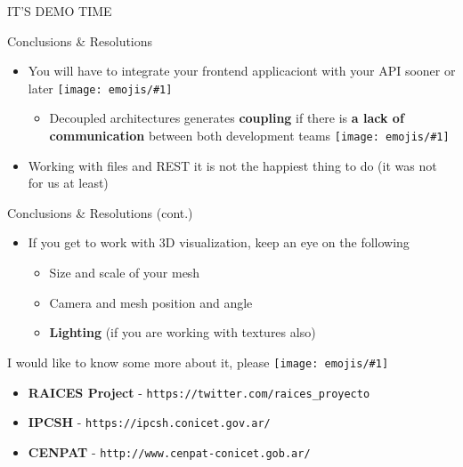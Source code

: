 \documentclass{beamer}
\newcommand{\emoji}[1]{\texttt{[image: emojis/\#1]}}
\begin{document}
\begin{frame}[fragile]
    \begin{center}
        \Huge
        IT'S DEMO TIME
    \end{center}
\end{frame}

\begin{frame}[fragile]{Conclusions \& Resolutions}
    \begin{itemize}
        \item You will have to integrate your frontend applicaciont  with your API sooner or later \emoji{man_shrugging.png}
        \begin{itemize}
            \item Decoupled architectures generates \textbf{coupling} if there is \textbf{a lack of communication} between both development teams \emoji{speak_no_evil.png}
        \end{itemize}
        \item Working with files and REST it is not the happiest thing to do (it was not for us at least)
    \end{itemize}
\end{frame}

\begin{frame}[fragile]{Conclusions \& Resolutions (cont.)}
    \begin{itemize}
        \item If you get to work with 3D visualization, keep an eye on the following
        \begin{itemize}
            \item Size and scale of your mesh
            \item Camera and mesh position and angle
            \item \textbf{Lighting} (if you are working with textures also) 
        \end{itemize}
    \end{itemize}
\end{frame}

\begin{frame}[fragile]{I would like to know some more about it, please \emoji{nerd.png}}
    \begin{itemize}
        \item \textbf{RAICES Project} - \texttt{https://twitter.com/raices\_proyecto}
        \item \textbf{IPCSH} - \texttt{https://ipcsh.conicet.gov.ar/} 
        \item \textbf{CENPAT} - \texttt{http://www.cenpat-conicet.gob.ar/} 
    \end{itemize}
\end{frame}
\end{document}
